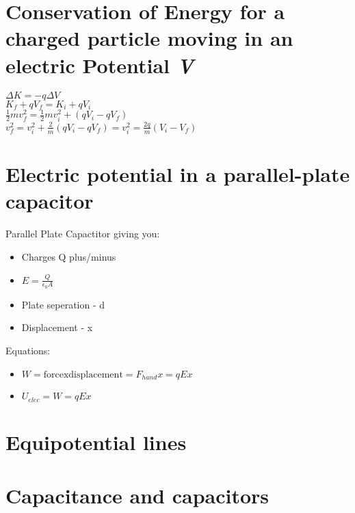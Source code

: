 \documentclass{report}
\begin{document}
\newpage

\section{Conservation of Energy for a charged particle moving in an electric Potential \textit{V}}
$ \Delta K = -q \Delta \textit{V} $
\\
$ K_f + q\textit{V}_f = K_i + q\textit{V}_i $
\\
$ \frac{1}{2} mv_f^2 = \frac{1}{2}mv_i^2 + (q\textit{V}_i - q\textit{V}_f) $
\\
$ v_f^2 = v_i^2 + \frac{2}{m}(q\textit{V}_i - q\textit{V}_f) = v_i^2 = \frac{2q}{m} (\textit{V}_i - \textit{V}_f) $

\section{Electric potential in a parallel-plate capacitor}
Parallel Plate Capactitor giving you:

\begin{itemize}
  \item Charges Q plus/minus
  \item $ E = \frac{Q}{\epsilon_0 A} $
  \item Plate seperation - d 
  \item Displacement - x 
\end{itemize}


Equations:
\begin{itemize}
\item $ W = \mathrm{force} \mathrm{x} \mathrm{displacement} = F_{hand}x = qEx $
  \item $ U_{elec} = W = qEx $
\end{itemize}

\section{Equipotential lines}

\section{Capacitance and capacitors}
\end{document}
